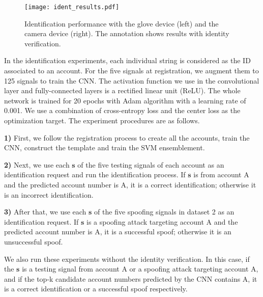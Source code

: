 \documentclass[conference]{IEEEtran}
\begin{document}
\begin{figure*}[t]
\centering
\texttt{[image: ident\_results.pdf]}
\vspace{-4.0in}
\caption{Identification performance with the glove device (left) and the camera device (right). The annotation shows results with identity verification.}
\label{fig:ident_results}
\end{figure*}


In the identification experiments, each individual string is considered as the ID associated to an account. For the five signals at registration, we augment them to 125 signals to train the CNN. The activation function we use in the convolutional layer and fully-connected layers is a rectified linear unit (ReLU). The whole network is trained for 20 epochs with Adam algorithm \cite{kingma2014adam} with a learning rate of 0.001. We use a combination of cross-entropy loss and the center loss \cite{wen2016discriminative} as the optimization target. The experiment procedures are as follows.

\textbf{1)} First, we follow the registration process to create all the accounts, train the CNN, construct the template and train the SVM ensemblement.

\textbf{2)} Next, we use each $\mathbf{s}$ of the five testing signals of each account as an identification request and run the identification process. If $\mathbf{s}$ is from account A and the predicted account number is A, it is a correct identification; otherwise it is an incorrect identification. 

\textbf{3)} After that, we use each $\mathbf{s}$ of the five spoofing signals in dataset 2 as an identification request. If $\mathbf{s}$ is a spoofing attack targeting account A and the predicted account number is A, it is a successful spoof; otherwise it is an unsuccessful spoof.

We also run these experiments without the identity verification. In this case, if the $\mathbf{s}$ is a testing signal from account A or a spoofing attack targeting account A, and if the top-k candidate account numbers predicted by the CNN contains A, it is a correct identification or a successful spoof respectively.
\end{document}
